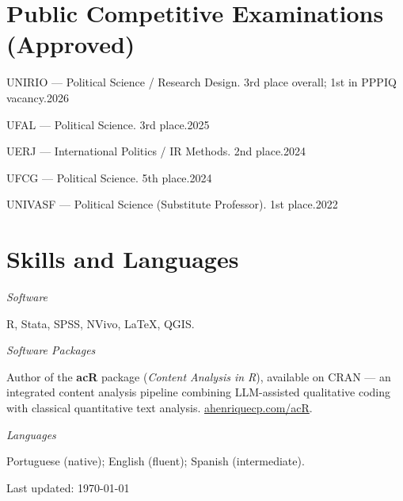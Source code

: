 \documentclass[11pt]{article}
\newcommand{\cvsubsection}[1]{\vspace{0.9em}\textit{#1}\par\vspace{0.35em}}
\newcommand{\entryplain}[2]{\noindent#1\hfill #2\par\vspace{0.15em}}
\begin{document}
\section{Public Competitive Examinations (Approved)}

\entryplain{UNIRIO --- Political Science / Research Design. 3rd place overall; 1st in PPPIQ vacancy.}{2026}
\entryplain{UFAL --- Political Science. 3rd place.}{2025}
\entryplain{UERJ --- International Politics / IR Methods. 2nd place.}{2024}
\entryplain{UFCG --- Political Science. 5th place.}{2024}
\entryplain{UNIVASF --- Political Science (Substitute Professor). 1st place.}{2022}

\section{Skills and Languages}
\cvsubsection{Software}
R, Stata, SPSS, NVivo, \LaTeX, QGIS.

\cvsubsection{Software Packages}
Author of the \textbf{acR} package (\textit{Content Analysis in R}), available on CRAN --- an integrated content analysis pipeline combining LLM-assisted qualitative coding with classical quantitative text analysis. \href{https://ahenriquecp.com/acR/}{ahenriquecp.com/acR}.

\cvsubsection{Languages}
Portuguese (native); English (fluent); Spanish (intermediate).

\vspace{1.2em}
\begin{center}
\footnotesize Last updated: \today
\end{center}
\end{document}
